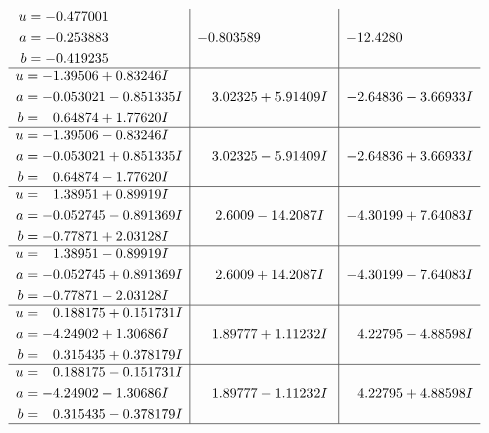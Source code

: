 \documentclass[1p]{elsarticle_modified}
\theoremstyle{definition}
\begin{document}
$$\begin{array}{c|c|c}
\begin{aligned}
u &= -0.477001\phantom{ +0.000000I} \\
a &= -0.253883\phantom{ +0.000000I} \\
b &= -0.419235\phantom{ +0.000000I}\end{aligned}
 & -0.803589\phantom{ +0.000000I} & -12.4280\phantom{ +0.000000I} \\ \hline\begin{aligned}
u &= -1.39506 + 0.83246 I \\
a &= -0.053021 - 0.851335 I \\
b &= \phantom{-}0.64874 + 1.77620 I\end{aligned}
 & \phantom{-}3.02325 + 5.91409 I & -2.64836 - 3.66933 I \\ \hline\begin{aligned}
u &= -1.39506 - 0.83246 I \\
a &= -0.053021 + 0.851335 I \\
b &= \phantom{-}0.64874 - 1.77620 I\end{aligned}
 & \phantom{-}3.02325 - 5.91409 I & -2.64836 + 3.66933 I \\ \hline\begin{aligned}
u &= \phantom{-}1.38951 + 0.89919 I \\
a &= -0.052745 - 0.891369 I \\
b &= -0.77871 + 2.03128 I\end{aligned}
 & \phantom{-}2.6009 - 14.2087 I & -4.30199 + 7.64083 I \\ \hline\begin{aligned}
u &= \phantom{-}1.38951 - 0.89919 I \\
a &= -0.052745 + 0.891369 I \\
b &= -0.77871 - 2.03128 I\end{aligned}
 & \phantom{-}2.6009 + 14.2087 I & -4.30199 - 7.64083 I \\ \hline\begin{aligned}
u &= \phantom{-}0.188175 + 0.151731 I \\
a &= -4.24902 + 1.30686 I \\
b &= \phantom{-}0.315435 + 0.378179 I\end{aligned}
 & \phantom{-}1.89777 + 1.11232 I & \phantom{-}4.22795 - 4.88598 I \\ \hline\begin{aligned}
u &= \phantom{-}0.188175 - 0.151731 I \\
a &= -4.24902 - 1.30686 I \\
b &= \phantom{-}0.315435 - 0.378179 I\end{aligned}
 & \phantom{-}1.89777 - 1.11232 I & \phantom{-}4.22795 + 4.88598 I\\
 \hline 
 \end{array}$$\newpage\newpage\renewcommand{\arraystretch}{1}
\end{document}
